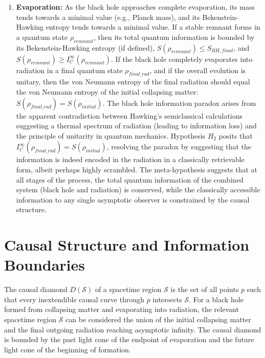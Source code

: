 \begin{hypothesis}
\begin{enumerate}
			\item \textbf{Evaporation:} As the black hole approaches complete evaporation, its mass tends towards a minimal value (e.g., Planck mass), and its Bekenstein-Hawking entropy tends towards a minimal value. If a stable remnant forms in a quantum state $\rho_{remnant}$, then its total quantum information is bounded by its Bekenstein-Hawking entropy (if defined), $S(\rho_{remnant}) \le S_{BH, final}$, and $S(\rho_{remnant}) \ge I_C^{\infty}(\rho_{remnant})$. If the black hole completely evaporates into radiation in a final quantum state $\rho_{final\_rad}$, and if the overall evolution is unitary, then the von Neumann entropy of the final radiation should equal the von Neumann entropy of the initial collapsing matter: $S(\rho_{final\_rad}) = S(\rho_{initial})$. The black hole information paradox arises from the apparent contradiction between Hawking's semiclassical calculations suggesting a thermal spectrum of radiation (leading to information loss) and the principle of unitarity in quantum mechanics. Hypothesis $H_2$ posits that $I_C^{\infty}(\rho_{final\_rad}) = S(\rho_{initial})$, resolving the paradox by suggesting that the information is indeed encoded in the radiation in a classically retrievable form, albeit perhaps highly scrambled. The meta-hypothesis suggests that at all stages of the process, the total quantum information of the combined system (black hole and radiation) is conserved, while the classically accessible information to any single asymptotic observer is constrained by the causal structure.
		\end{enumerate}
	\end{hypothesis}
	
	\section{Causal Structure and Information Boundaries}
	
	\begin{definition}
		The causal diamond $D(\mathcal{S})$ of a spacetime region $\mathcal{S}$ is the set of all points $p$ such that every inextendible causal curve through $p$ intersects $\mathcal{S}$. For a black hole formed from collapsing matter and evaporating into radiation, the relevant spacetime region $\mathcal{S}$ can be considered the union of the initial collapsing matter and the final outgoing radiation reaching asymptotic infinity. The causal diamond is bounded by the past light cone of the endpoint of evaporation and the future light cone of the beginning of formation.
	\end{definition}
	

